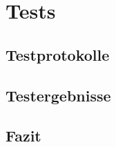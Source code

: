 \chapter{Tests}
\label{chap:Tests}

\section{Testprotokolle}
\label{sec:Testprotokolle}
\Blindtext[2][3] 
\blinditemize

\section {Testergebnisse}
\label{sec:Testergebnisse}

\section{Fazit}
\label{sec:Fazit}